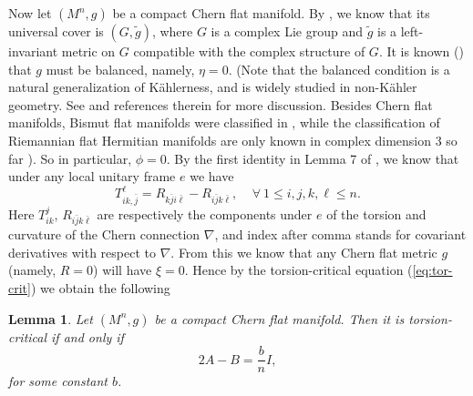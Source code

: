 \documentclass{amsart}
\newtheorem{lemma}{Lemma}
\begin{document}
Now let $(M^n,g)$ be a compact Chern flat manifold. By \cite{Boothby}, we know that its universal cover is $(G,\tilde{g})$, where $G$ is a complex Lie group and $\tilde{g}$ is a left-invariant metric on $G$ compatible with the complex structure of $G$. It is known (\cite[Theorem 3]{YZ}) that $g$ must be balanced, namely, $\eta =0$. (Note that the balanced condition is a natural generalization of K\"ahlerness, and is widely studied in non-K\"ahler geometry. See \cite{Fu} and references therein for more discussion. Besides Chern flat manifolds, Bismut flat manifolds were classified in \cite{WYZ}, while the classification of Riemannian flat Hermitian manifolds are only known in complex dimension $3$ so far \cite{KYZ}).  So in particular, $\phi =0$. By the first identity in Lemma 7 of \cite{YZ}, we know that under any local unitary frame $e$ we have
$$ T^{\ell}_{ik,\bar{j}} = R_{k\bar{j}i\bar{\ell}} - R_{i\bar{j}k\bar{\ell}}, \ \ \ \ \ \forall \ 1\leq i,j,k,\ell \leq n. $$
Here $T^j_{ik}$, $R_{i\bar{j}k\bar{\ell}}$  are respectively the components under $e$ of the torsion and curvature of the Chern connection $\nabla$, and index after comma stands for covariant derivatives with respect to $\nabla$. From this we know that any Chern flat metric $g$  (namely, $R=0$) will have $\xi=0$. Hence by the torsion-critical equation (\ref{eq:tor-crit}) we obtain the following
\begin{lemma} \label{lemma1}
Let $(M^n,g)$ be a compact Chern flat manifold. Then it is torsion-critical if and only if 
\begin{equation} \label{eq:6}
2A - B = \frac{b}{n}I,
\end{equation} 
for some constant $b$. 
\end{lemma} 
\end{document}
